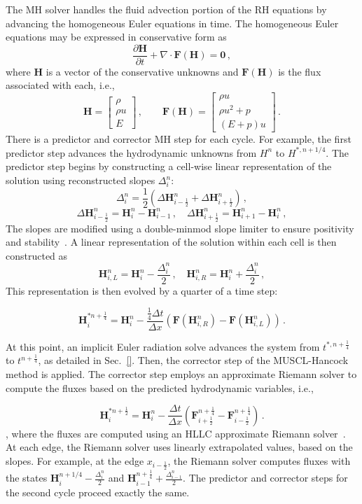 \documentclass[preprint,12pt]{elsarticle}
\newcommand{\dydt}[1]{\frac{\partial #1}{\partial t}}
\newcommand{\pec}{\, ,}
\newcommand{\pep}{\, .}
\newcommand{\half}{\frac{1}{2}}
\newcommand{\fourth}{\frac{1}{4}}
\newcommand{\E}{{E_r}}
\renewcommand{\H}{\mathbf{H}}
\newcommand{\Flux}{\mathbf{F}}
\newcommand{\dt}{\Delta t}
\newcommand{\dx}{\Delta x}
\newcommand{\iL}{_{i,L}}
\newcommand{\iR}{_{i,R}}
\newcommand{\hydroPredictor}[4]{
\begin{equation}#4
  \H_i^{#2} = \H_i^{#1} - \frac{#3\dt}{\dx}
  \left(\Flux(\H\iR^{#1}) - \Flux(\H\iL^{#1})\right) \pep
\end{equation}
}
\newcommand{\hydroCorrector}[5]{
\begin{equation}#5
  \H_i^{#3} = \H_i^{#1} - \frac{#4\dt}{\dx}
  \left(\Flux_{i+\half}^{#2} - \Flux_{i-\half}^{#2}\right) \pep
\end{equation}
}
\begin{document}
The MH solver handles the fluid advection portion of the RH equations by advancing the homogeneous Euler equations
in time.   The homogeneous Euler equations may be expressed in conservative form as
\begin{equation}
  \dydt{\H} + \nabla\cdot\Flux(\H) = \mathbf{0} \pec
\end{equation}
where $\H$ is a vector of the conservative unknowns
and $\Flux(\H)$ is the flux associated with each, i.e.,
\begin{equation}
  \H=\left[\begin{array}{c}\rho\\\rho u\\E\end{array}\right] \pec\qquad
  \Flux(\H)=\left[\begin{array}{c}\rho u\\
  \rho u^2 + p\\
  (E+p)u\end{array}\right] \pep
\end{equation}
There is a predictor and corrector MH step for each cycle. For example, the first predictor step advances the hydrodynamic unknowns
from $H^{n}$ to $H^{*,n+1/4}$.
The predictor step begins by constructing a cell-wise linear representation of the solution
using reconstructed slopes $\Delta_i^n$:
\begin{equation}\label{eq:muscl_slopes}
  \Delta_i^n = \half\left(\Delta\H_{i-\half}^n + \Delta\H_{i+\half}^n\right) \pec
\end{equation}
\begin{equation}\label{eq:muscl_differences}
  \Delta\H_{i-\half}^n = \H_i^n - \H_{i-1}^n \pec\quad
  \Delta\H_{i+\half}^n = \H_{i+1}^n - \H_i^n \pec
\end{equation}
The slopes are modified using a double-minmod slope
limiter to ensure positivity and stability~\cite{NEED_SLOPE_LIMITER_REFERENCE???}.
A linear representation
of the solution within each cell is then constructed as
\begin{equation}\label{eq:edge_hydro}
  \H\iL^n = \H_i^n - \frac{{\Delta}_i^n}{2} \pec
  \quad
  \H\iR^n = \H_i^n + \frac{{\Delta}_i^n}{2} \pec
\end{equation}
This representation is then evolved by a quarter of a time step:
\hydroPredictor{n}{*n+\fourth}{\fourth}{\label{eq:muscl_predictor}}

At this point, an implicit Euler radiation solve advances the system from $t^{*,n+\fourth}$
to $t^{n+\fourth}$, as detailed in Sec.~\ref{}.  Then, the corrector step of the
MUSCL-Hancock method is applied.  The corrector step employs an approximate Riemann solver
to compute the fluxes based on the predicted hydrodynamic variables, i.e.,
\hydroCorrector{n}{n+\fourth}{*n+\half}{}{\label{eq:muscl_corrector}},
where the fluxes are computed using an HLLC approximate Riemann solver~\cite{toro}.  At
each edge, the Riemann solver uses linearly extrapolated values, based on the slopes.  For example, at the edge
$x_{i-\half}$, the Riemann solver computes fluxes with the states
$\H_{i}^{n+1/4}-\frac{\Delta_i^n}{2}$ and $\H_{i-1}^{n+\fourth}+\frac{\Delta_{i-1}^n}{2}$.
The predictor and corrector steps for the second cycle proceed exactly the same.
\end{document}
